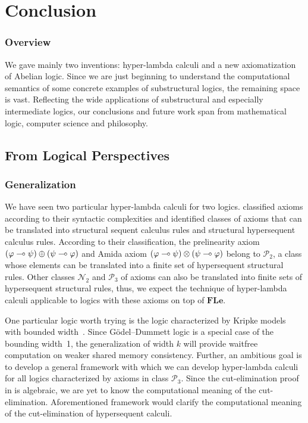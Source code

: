 \chapter{Conclusion}

\subsection{Overview}

We gave mainly two inventions: hyper-lambda calculi and a new
axiomatization of Abelian logic.
Since we are just beginning to understand the computational semantics of
some concrete examples of substructural logics, the remaining space is
vast.
Reflecting the wide applications of substructural and especially
intermediate logics,
our conclusions and future work span from mathematical logic, computer
science and philosophy.

\section{From Logical Perspectives}

\subsection{Generalization}

We have seen two particular hyper-lambda calculi for two logics.
\citet{alg} classified axioms according to their syntactic complexities
and identified classes of axioms that can be translated into structural
sequent calculus rules and structural hypersequent calculus rules.
According to their classification, the prelinearity axiom
$(\varphi\multimap\psi)\oplus(\psi\multimap\varphi)$ and Amida axiom
$(\varphi\multimap\psi)\otimes(\psi\multimap\varphi)$ belong to $\mathcal P_2$, a
class whose elements can be translated into a finite set of
hypersequent structural rules.
Other classes $\mathcal N_2$ and $\mathcal P_3$ of axioms can also be
translated into finite sets of hypersequent structural rules,
thus, we expect the technique of hyper-lambda calculi applicable to
logics with these axioms on top of $\mathbf{FLe}$.

One particular logic worth trying is
the logic characterized by Kripke models with bounded width~\citep{Ciabattoni01042001}.
Since G\"odel--Dummett logic is a special case of the bounding width~1,
the generalization of width $k$ will provide waitfree computation on
weaker shared memory consistency.  Further,
an ambitious goal is to develop a general framework with which we can
develop hyper-lambda calculi for all logics characterized by axioms in
class $\mathcal P_3$.
Since the cut-elimination proof in \citep{alg} is algebraic,
we are yet to know the computational meaning of the cut-elimination.
Aforementioned framework would clarify the computational meaning of the
cut-elimination of hypersequent calculi.

